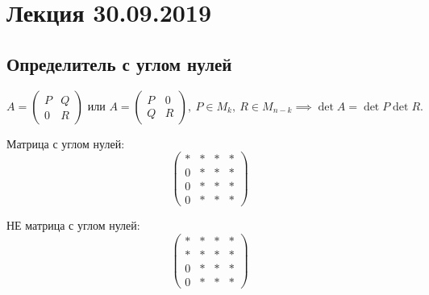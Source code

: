 \section{Лекция 30.09.2019}

\subsection{Определитель с углом нулей}

\begin{proposal}
    \begin{equation*}
        A = \left(
            \begin{array}{c|c}
                P & Q \\
                \hline
                0 & R
            \end{array}
        \right) \text{ или } A =
        \left(
            \begin{array}{c|c}
                P & 0 \\
                \hline
                Q & R
            \end{array}
        \right), \ P \in M_k, \ R \in M_{n-k} \implies \det A = \det P \det R
    .\end{equation*}
\end{proposal}

Матрица с углом нулей:
\begin{equation*}
\left(
\begin{array}{c|ccc}
  * & * & * & * \\
  \hline
  0 & * & * & * \\
  0 & * & * & * \\
  0 & * & * & *
\end{array}
\right)
\end{equation*}

НЕ матрица с углом нулей:
\begin{equation*}
\left(
\begin{array}{c|ccc}
  * & * & * & * \\
  * & * & * & * \\
  \hline
  0 & * & * & * \\
  0 & * & * & *
\end{array}
\right)
\end{equation*}


